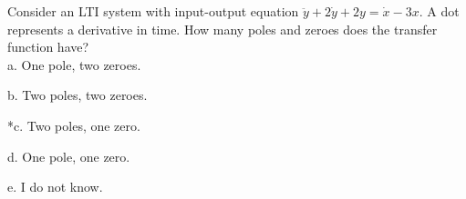
Consider an LTI system with input-output equation \(\ddot{y} + 2\dot{y} + 2y = \dot{x} - 3x\). A dot represents a derivative in time. How many poles and zeroes does the transfer function have? \\

a. One pole, two zeroes.

b. Two poles, two zeroes.

*c. Two poles, one zero.

d. One pole, one zero.

e. I do not know. \\
